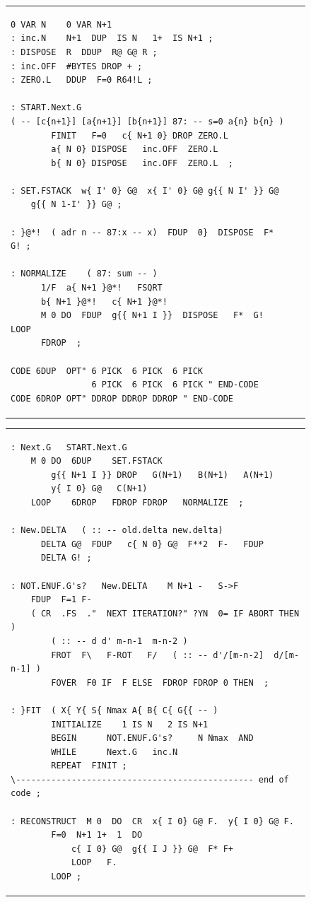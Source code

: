 \begin{figure}[H]
\begin{tabular}{l|l}
\begin{lstlisting}
0 VAR N    0 VAR N+1
: inc.N    N+1  DUP  IS N   1+  IS N+1 ;
: DISPOSE  R  DDUP  R@ G@ R ;
: inc.OFF  #BYTES DROP + ;
: ZERO.L   DDUP  F=0 R64!L ;

: START.Next.G
( -- [c{n+1}] [a{n+1}] [b{n+1}] 87: -- s=0 a{n} b{n} )
        FINIT   F=0   c{ N+1 0} DROP ZERO.L
        a{ N 0} DISPOSE   inc.OFF  ZERO.L
        b{ N 0} DISPOSE   inc.OFF  ZERO.L  ;

: SET.FSTACK  w{ I' 0} G@  x{ I' 0} G@ g{{ N I' }} G@
    g{{ N 1-I' }} G@ ;

: }@*!  ( adr n -- 87:x -- x)  FDUP  0}  DISPOSE  F*  G! ;

: NORMALIZE    ( 87: sum -- )  
      1/F  a{ N+1 }@*!   FSQRT
      b{ N+1 }@*!   c{ N+1 }@*!
      M 0 DO  FDUP  g{{ N+1 I }}  DISPOSE   F*  G!  LOOP
      FDROP  ;

CODE 6DUP  OPT" 6 PICK  6 PICK  6 PICK
                6 PICK  6 PICK  6 PICK " END-CODE
CODE 6DROP OPT" DDROP DDROP DDROP " END-CODE
        \end{lstlisting}
    \end{tabular}
\end{figure}

\begin{figure}[H]
    \centering
    \scriptsize
    \setlength{\tabcolsep}{.4em}
    \begin{tabular}{l}
        \begin{lstlisting}
: Next.G   START.Next.G 
    M 0 DO  6DUP    SET.FSTACK
        g{{ N+1 I }} DROP   G(N+1)   B(N+1)   A(N+1)
        y{ I 0} G@   C(N+1)
    LOOP    6DROP   FDROP FDROP   NORMALIZE  ;

: New.DELTA   ( :: -- old.delta new.delta)
      DELTA G@  FDUP   c{ N 0} G@  F**2  F-   FDUP
      DELTA G! ;

: NOT.ENUF.G's?   New.DELTA    M N+1 -   S->F
    FDUP  F=1 F- 
    ( CR  .FS  ."  NEXT ITERATION?" ?YN  0= IF ABORT THEN )
        ( :: -- d d' m-n-1  m-n-2 )  
        FROT  F\   F-ROT   F/   ( :: -- d'/[m-n-2]  d/[m-n-1] )
        FOVER  F0 IF  F ELSE  FDROP FDROP 0 THEN  ;

: }FIT  ( X{ Y{ S{ Nmax A{ B{ C{ G{{ -- )
        INITIALIZE    1 IS N   2 IS N+1
        BEGIN      NOT.ENUF.G's?     N Nmax  AND 
        WHILE      Next.G   inc.N
        REPEAT  FINIT ;
\----------------------------------------------- end of code ;

: RECONSTRUCT  M 0  DO  CR  x{ I 0} G@ F.  y{ I 0} G@ F. 
        F=0  N+1 1+  1  DO 
            c{ I 0} G@  g{{ I J }} G@  F* F+ 
            LOOP   F. 
        LOOP ;
        \end{lstlisting}
    \end{tabular}
\end{figure}